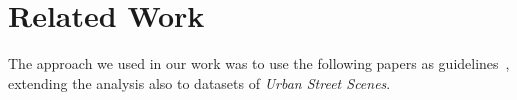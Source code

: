\documentclass[10pt,twocolumn,letterpaper]{article}
\begin{document}

\section{Related Work}
\label{sec:related-work}
The approach we used in our work was to use the following papers as guidelines~\cite{Authors1_maskrcnn, Authors2_BlendMask, Authors6_SOLOv2, Authors7_deepsnake}, extending the analysis also to datasets of \textit{Urban Street Scenes}.
\end{document}

